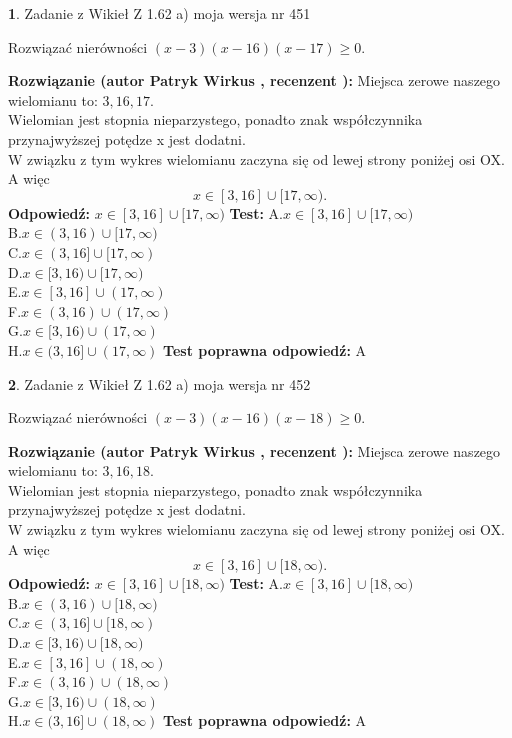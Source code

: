 \documentclass[12pt, a4paper]{article}
\theoremstyle{definition} %
\newtheorem{zad}{}
\newcommand{\zadStart}[1]{\begin{zad}#1\newline}
\newcommand{\zadStop}{\end{zad}}
\newcommand{\rozwStart}[2]{\noindent \textbf{Rozwiązanie (autor #1 , recenzent #2): }\newline}
\newcommand{\rozwStop}{\newline}
\newcommand{\odpStart}{\noindent \textbf{Odpowiedź:}\newline}
\newcommand{\odpStop}{\newline}
\newcommand{\testStart}{\noindent \textbf{Test:}\newline}
\newcommand{\testStop}{\newline}
\newcommand{\kluczStart}{\noindent \textbf{Test poprawna odpowiedź:}\newline}
\newcommand{\kluczStop}{\newline}
\begin{document}
\zadStart{Zadanie z Wikieł Z 1.62 a) moja wersja nr 451}

Rozwiązać nierówności $(x-3)(x-16)(x-17)\ge0$.
\zadStop
\rozwStart{Patryk Wirkus}{}
Miejsca zerowe naszego wielomianu to: $3, 16, 17$.\\
Wielomian jest stopnia nieparzystego, ponadto znak współczynnika przy\linebreak najwyższej potędze x jest dodatni.\\ W związku z tym wykres wielomianu zaczyna się od lewej strony poniżej osi OX. A więc $$x \in [3,16] \cup [17,\infty).$$
\rozwStop
\odpStart
$x \in [3,16] \cup [17,\infty)$
\odpStop
\testStart
A.$x \in [3,16] \cup [17,\infty)$\\
B.$x \in (3,16) \cup [17,\infty)$\\
C.$x \in (3,16] \cup [17,\infty)$\\
D.$x \in [3,16) \cup [17,\infty)$\\
E.$x \in [3,16] \cup (17,\infty)$\\
F.$x \in (3,16) \cup (17,\infty)$\\
G.$x \in [3,16) \cup (17,\infty)$\\
H.$x \in (3,16] \cup (17,\infty)$
\testStop
\kluczStart
A
\kluczStop



\zadStart{Zadanie z Wikieł Z 1.62 a) moja wersja nr 452}

Rozwiązać nierówności $(x-3)(x-16)(x-18)\ge0$.
\zadStop
\rozwStart{Patryk Wirkus}{}
Miejsca zerowe naszego wielomianu to: $3, 16, 18$.\\
Wielomian jest stopnia nieparzystego, ponadto znak współczynnika przy\linebreak najwyższej potędze x jest dodatni.\\ W związku z tym wykres wielomianu zaczyna się od lewej strony poniżej osi OX. A więc $$x \in [3,16] \cup [18,\infty).$$
\rozwStop
\odpStart
$x \in [3,16] \cup [18,\infty)$
\odpStop
\testStart
A.$x \in [3,16] \cup [18,\infty)$\\
B.$x \in (3,16) \cup [18,\infty)$\\
C.$x \in (3,16] \cup [18,\infty)$\\
D.$x \in [3,16) \cup [18,\infty)$\\
E.$x \in [3,16] \cup (18,\infty)$\\
F.$x \in (3,16) \cup (18,\infty)$\\
G.$x \in [3,16) \cup (18,\infty)$\\
H.$x \in (3,16] \cup (18,\infty)$
\testStop
\kluczStart
A
\kluczStop
\end{document}
